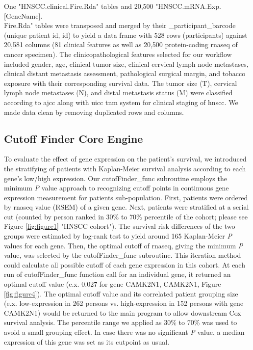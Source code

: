 \documentclass[jpm,article,submit,moreauthors,pdftex]{Definitions/mdpi}
\begin{document}
\begin{paracol}{2}
One "HNSCC.clinical.Fire.Rda" tables and 20,500 "HNSCC.mRNA.Exp.[GeneName].\\
Fire.Rda" tables were transposed and merged by their \_participant\_barcode (unique patient \acrlong{id}, \acrshort{id}) to yield a data frame with 528 rows (participants) against 20,581 columns (81 clinical features as well as 20,500 protein-coding \acrshort{rnaseq} of cancer specimen).
The clinicopathological features selected for our workflow included gender, age, clinical tumor size, clinical cervical lymph node metastases, clinical distant metastasis assessment, pathological surgical margin, and tobacco exposure with their corresponding survival data.
The tumor size (T), cervical lymph node metastases (N), and distal metastasis status (M) were classified according to \acrfull{ajcc}\cite{Amin2017} along with \acrfull{uicc}\cite{Brierley2016} \acrshort{tnm} system for clinical staging of \acrshort{hnscc}.
We made data clean by removing duplicated rows and columns.


\subsection{Cutoff Finder Core Engine}

To evaluate the effect of gene expression on the patient's survival, we introduced the stratifying of patients with Kaplan-Meier survival analysis according to each gene's low/high expression.
Our cutofFinder\_func subroutine employs the minimum \textit{P} value approach to recognizing cutoff points in continuous gene expression measurement for patients sub-population.
First, patients were ordered by \acrshort{rnaseq} value (RSEM) of a given gene. Next, patients were stratified at a serial cut (counted by person ranked in 30\% to 70\% percentile of the cohort; please see Figure \ref{fig:figure1} "HNSCC cohort"). The survival risk differences of the two groups were estimated by log-rank test to yield around 165 Kaplan-Meier \textit{P} values for each gene.
Then, the optimal cutoff of \acrshort{rnaseq}, giving the minimum \textit{P} value, was selected by the cutofFinder\_func subroutine.
This iteration method could calculate all possible cutoff of each gene expression in this cohort. At each run of cutofFinder\_func function call for an individual gene, it returned an optimal cutoff value (e.x. 0.027 for gene \acrlong{CAMK2N1}, \acrshort{CAMK2N1}, Figure \ref{fig:figure4}). The optimal cutoff value and its correlated patient grouping size (e.x. low-expression in 262 persons vs. high-expression in 152 persons with gene \acrshort{CAMK2N1}) would be returned to the main program to allow downstream Cox survival analysis. The percentile range we applied as 30\% to 70\% was used to avoid a small grouping effect\cite{Miller1982}\cite{Mizuno2009a}.
In case there was no significant \textit{P} value, a median expression of this gene was set as its cutpoint as usual.


\end{paracol}
\end{document}
